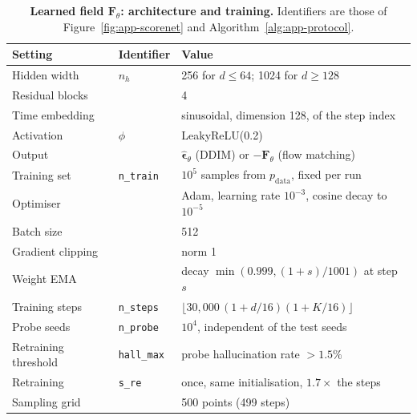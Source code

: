 \begin{table}[htbp]
\centering
\small
\caption{\textbf{Learned field $\boldsymbol{F}_\theta$: architecture and training.} Identifiers are
those of Figure~\ref{fig:app-scorenet} and Algorithm~\ref{alg:app-protocol}.}
\label{tab:app-scorenet}
\begin{tabular}{lll}
\toprule
Setting & Identifier & Value \\
\midrule
Hidden width                  & $n_h$                  & 256 for $d \le 64$; 1024 for $d \ge 128$ \\
Residual blocks               &                        & 4 \\
Time embedding                &                        & sinusoidal, dimension 128, of the step index \\
Activation                    & $\phi$                 & LeakyReLU(0.2) \\
Output                        &                        & $\hat{\boldsymbol{\epsilon}}_\theta$ (DDIM) or $-\boldsymbol{F}_\theta$ (flow matching) \\
\midrule
Training set                  & \texttt{n\_train}      & $10^5$ samples from $p_{\text{data}}$, fixed per run \\
Optimiser                     &                        & Adam, learning rate $10^{-3}$, cosine decay to $10^{-5}$ \\
Batch size                    &                        & 512 \\
Gradient clipping             &                        & norm 1 \\
Weight EMA                    &                        & decay $\min(0.999, (1 + s)/1001)$ at step $s$ \\
Training steps                & \texttt{n\_steps}      & $\lfloor 30{,}000\,(1 + d/16)(1 + K/16) \rfloor$ \\
Probe seeds                   & \texttt{n\_probe}      & $10^4$, independent of the test seeds \\
Retraining threshold          & \texttt{hall\_max}     & probe hallucination rate $> 1.5\%$ \\
Retraining                    & \texttt{s\_re}         & once, same initialisation, $1.7\times$ the steps \\
Sampling grid                 &                        & 500 points (499 steps) \\
\bottomrule
\end{tabular}
\end{table}


